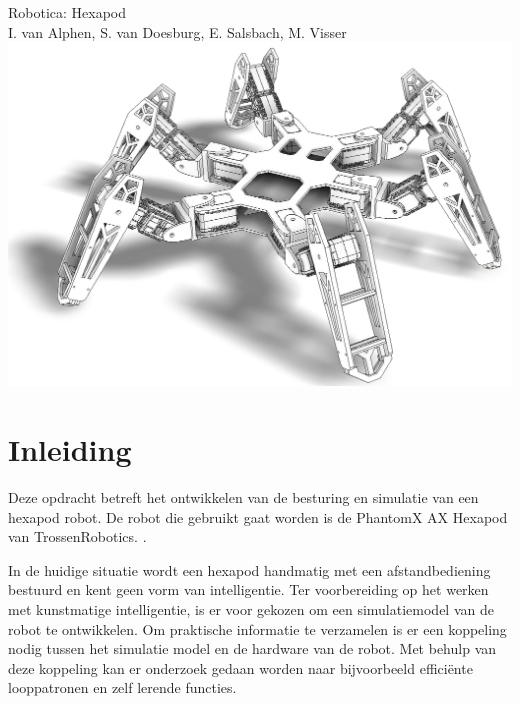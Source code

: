 \documentclass[10pt,a4paper]{article}
\begin{document}
\begin{titlepage}
    \centering
    \vfill
    {\Large
        Robotica: Hexapod\\
        \vskip2cm
        I. van Alphen, S. van Doesburg, E.  Salsbach, M. Visser\\
    }    
    \vfill
    \includegraphics[width=1\textwidth]{WireS4}
    \vfill
    \vfill
\end{titlepage}

\newpage

\tableofcontents
\newpage

\section{Inleiding}
Deze opdracht betreft het ontwikkelen van de besturing en simulatie van een hexapod robot.\cite{beroepsopdrachten} De robot die gebruikt gaat worden is de PhantomX AX Hexapod van TrossenRobotics. \cite{PhantomX AX Hexapod Kit}.

In de huidige situatie wordt een hexapod handmatig met een afstandbediening bestuurd en kent geen vorm van intelligentie. Ter voorbereiding op het werken met kunstmatige intelligentie, is er voor gekozen om een simulatiemodel van de robot te ontwikkelen. Om praktische informatie te verzamelen is er een koppeling nodig tussen het simulatie model en de hardware van de robot. Met behulp van deze koppeling kan er onderzoek gedaan worden naar bijvoorbeeld effici\"ente looppatronen en zelf lerende functies.
\end{document}

